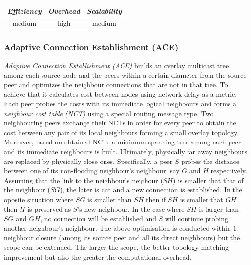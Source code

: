 \begin{center}
\begin{tabular}{ccc}
\emph{Efficiency} & \emph{Overhead} & \emph{Scalability} \\
\hline
%
medium &
high &
medium
\end{tabular}
\end{center}

\subsubsection{Adaptive Connection Establishment (ACE)}
\emph{Adaptive Connection Establishment (ACE)} \cite{liu_ace_2004} builds an
overlay multicast tree among each source node and the peers within a certain
diameter from the source peer and optimizes the neighbour connections that are
not in that tree. To achieve that it calculates cost between nodes using network
delay as a metric. Each peer probes the costs with its immediate logical
neighbours and forms a \emph{neighbour cost table (NCT)} using a special
routing message type. Two neighbouring peers exchange their NCTs in order for
every peer to obtain the cost between any pair of its local neighbours forming a
small overlay topology. Moreover, based on obtained NCTs a minimum spanning tree
among each peer and its immediate neighbours is built. Ultimately, physically
far away neighbours are replaced by physically close ones. Specifically, a peer
$S$ probes the distance between one of its non-flooding neighbour's neighbour,
say $G$ and $H$ respectively. Assuming that the link to the neighbour's neigbour
($SH$) is smaller that that of the neighbour ($SG$), the later is cut and a new
connection is established. In the oposite situation where $SG$ is smaller than
$SH$ then if $SH$ is smaller that $GH$ then $H$ is preserved as $S$'s new
neighbour. In the case where $SH$ is larger than $SG$ and $GH$, no connection
will be established and $S$ will continue probing another neighbour's neighbour.
The above optimisation is conducted within $1$-neighbour closure (among its
source peer and all its direct neighbours) but the scope can be extended. The
larger the scope, the better topology matching improvement but also the greater
the computational overhead.

